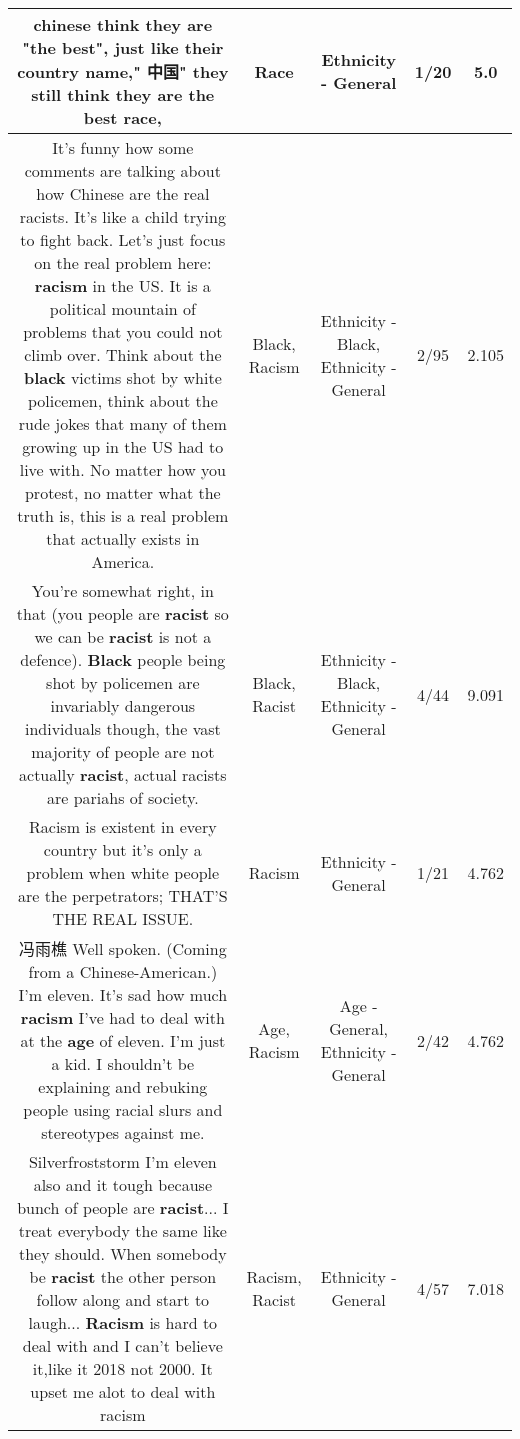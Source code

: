 \documentclass[11pt]{article}
\newlength\mylength
\begin{document}
\begin{center}
\begin{longtable}{|C{.65\mylength}|C{.30\mylength}|C{.12\mylength}|C{.12\mylength}|C{.12\mylength}|}
  \small chinese think they are "the best", just like their country name," 中国" they still think they are the best \textbf{race},\normalsize   & Race & Ethnicity - General & 1/20 & 5.0 \\  \hline
  \small It's funny how some comments are talking about how Chinese are the real racists. It's like a child trying to fight back. Let's just focus on the real problem here: \textbf{racism} in the US. It is a political mountain of problems that you could not climb over. Think about the \textbf{black} victims shot by white policemen, think about the rude jokes that many of them growing up in the US had to live with. No matter how you protest, no matter what the truth is, this is a real problem that actually exists in America.\normalsize   & Black, Racism & Ethnicity - Black, Ethnicity - General & 2/95 & 2.105 \\  \hline
  \small You're somewhat right, in that (you people are \textbf{racist} so we can be \textbf{racist} is not a defence). \textbf{Black} people being shot by policemen are invariably dangerous individuals though, the vast majority of people are not actually \textbf{racist}, actual racists are pariahs of society.\normalsize   & Black, Racist & Ethnicity - Black, Ethnicity - General & 4/44 & 9.091 \\  \hline
  \small Racism is existent in every country but it's only a problem when white people are the perpetrators; THAT'S THE REAL ISSUE.\normalsize   & Racism & Ethnicity - General & 1/21 & 4.762 \\  \hline
  \small 冯雨樵 Well spoken. (Coming from a Chinese-American.) I'm eleven. It's sad how much \textbf{racism} I've had to deal with at the \textbf{age} of eleven. I'm just a kid. I shouldn't be explaining and rebuking people using racial slurs and stereotypes against me.\normalsize   & Age, Racism & Age - General, Ethnicity - General & 2/42 & 4.762 \\  \hline
  \small Silverfroststorm I'm eleven also and it tough because bunch of people are \textbf{racist}... I treat everybody the same like they should. When somebody be \textbf{racist} the other person follow along and start to laugh... \textbf{Racism} is hard to deal with and I can't believe it,like it 2018 not 2000. It upset me alot to deal with racism\normalsize   & Racism, Racist & Ethnicity - General & 4/57 & 7.018 \\  \hline

\end{longtable}
\end{center}
\end{document}

